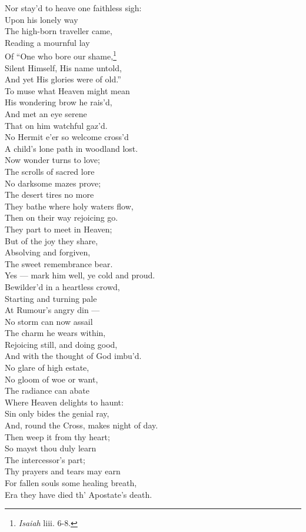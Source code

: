  Nor stay’d to heave one faithless sigh: \\
  Upon his lonely way \\
 The high-born traveller came, \\
 Reading a mournful lay \\
 Of “One who bore our shame,\footnote{\emph{Isaiah} liii. 6-8.} \\
 Silent Himself, His name untold, \\
 And yet His glories were of old.” \\
  To muse what Heaven might mean \\
 His wondering brow he rais’d, \\
 And met an eye serene \\
 That on him watchful gaz’d. \\
 No Hermit e’er so welcome cross’d \\
 A child’s lone path in woodland lost. \\
  Now wonder turns to love; \\
 The scrolls of sacred lore \\
 No darksome mazes prove; \\
 The desert tires no more \\
 They bathe where holy waters flow, \\
 Then on their way rejoicing go. \\
  They part to meet in Heaven; \\
 But of the joy they share, \\
 Absolving and forgiven, \\
 The sweet remembrance bear. \\
 Yes — mark him well, ye cold and proud. \\
 Bewilder’d in a heartless crowd, \\
  Starting and turning pale \\
 At Rumour’s angry din — \\
 No storm can now assail \\
 The charm he wears within, \\
 Rejoicing still, and doing good, \\
 And with the thought of God imbu’d. \\
  No glare of high estate, \\
 No gloom of woe or want, \\
 The radiance can abate \\
 Where Heaven delights to haunt: \\
 Sin only bides the genial ray, \\
 And, round the Cross, makes night of day. \\
  Then weep it from thy heart; \\
 So mayst thou duly learn \\
 The intercessor’s part; \\
 Thy prayers and tears may earn \\
 For fallen souls some healing breath, \\
 Era they have died th’ Apostate’s death.\\

